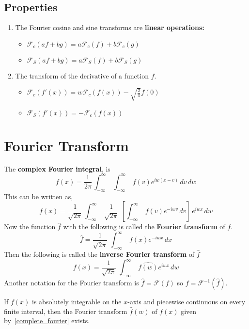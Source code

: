 \message{ !name(ch3_aima331.tex)}\documentclass[aima331_lecturenotes_ku.tex]{subfiles}
\begin{document}
  \subsection{Properties}
  \begin{enumerate}
  \item The Fourier cosine and sine transforms are \textbf{linear operations:}
  \begin{itemize}
  \item $\mathcal{F}_c (af+bg)=a\mathcal{F}_c(f) + b \mathcal{F}_c(g)$
   \item $\mathcal{F}_S (af+bg)=a\mathcal{F}_S(f) + b \mathcal{F}_S(g)$
   \end{itemize}

 \item The transform of the derivative of a function $f$.
   \begin{itemize}
   \item $\displaystyle \mathcal{F}_c(f'(x))=w\mathcal{F}_c(f(x)) -\sqrt{\frac{2}{\pi}} f(0)$
     \vspace{2mm}
   \item $\displaystyle \mathcal{F}_S(f'(x)) = -\mathcal{F}_c(f(x))$
   \end{itemize}
 \end{enumerate}

 \section{Fourier Transform}
 The \textbf{complex Fourier integral}, is
 \begin{equation}
   \label{complex_fourier_integral}
   f(x)=\frac{1}{2\pi} \, \int_{-\infty}^{\infty}\;\int_{-\infty}^{\infty} \; f(v) e^{iw(x-v)}\,dv\,dw
 \end{equation}
 This can be written as,
 \begin{equation*}
   \label{complex_fourier_integral1}
   f(x)=\frac{1}{\sqrt{2\pi}} \, \int_{-\infty}^{\infty}\;\frac{1}{\sqrt{2\pi}} \; \left [\int_{-\infty}^{\infty} \; f(v) e^{-iwv}\,dv \right ] \,e^{iwx} \,dw
 \end{equation*}
 Now the function $\hat{f}$ with the following is called the \textbf{Fourier transform} of $f$.
 \begin{equation}
   \label{eq:1}
   \hat{f} = \frac{1}{\sqrt{2\pi}} \; \int_{-\infty}^{\infty} \; f(x) e^{-iwx}\,dx
 \end{equation}
 Then the following is called the \textbf{inverse Fourier transform} of $\hat{f}$
 \begin{equation}
   \label{complete_fourier}
   f(x) =\frac{1}{\sqrt{2\pi}}\; \int_{-\infty}^{\infty} \; \hat{f(w)} e^{iwx}\,dw
 \end{equation}
 Another notation for the Fourier transform is $\hat{f}=\mathcal{F}(f)$ so $f=\mathcal{F}^{-1}(\hat{f})$.
 \begin{theorem}
   If $f(x)$ is absolutely integrable on the $x$-axis and piecewise continuous on every finite interval, then the Fourier transform $\hat{f}(w)$ of $f(x)$ given by~\ref{complete_fourier} exists.
 \end{theorem}
\end{document}
